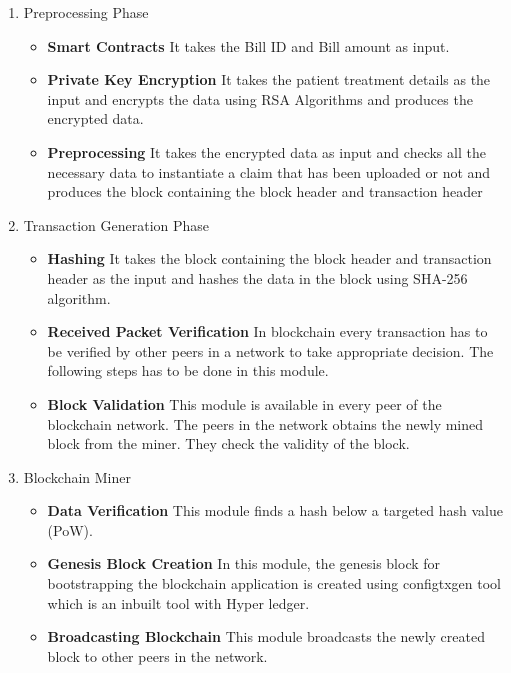 \begin{enumerate}
    \item Preprocessing Phase
    \begin{itemize}
        \item \textbf{Smart Contracts}
        It takes the Bill ID and Bill amount as input.
        
\item \textbf{Private Key Encryption}
It takes the patient treatment details as the input and encrypts the data using RSA Algorithms and produces the encrypted data.
\item \textbf{Preprocessing}
It takes the encrypted data as input and checks all the necessary data to instantiate a claim that has been uploaded or not and produces the block containing the block header and transaction header
    \end{itemize}
    \item Transaction Generation Phase
    \begin{itemize}
        \item \textbf{Hashing}
        It takes the block containing the block header and transaction header as the input and hashes the data in the block using SHA-256 algorithm.
        \item \textbf{Received Packet Verification}
        In blockchain every transaction has to be verified by other peers in a network to take appropriate decision. The following steps has to be done in this module.
        \item \textbf{Block Validation}
        This module is available in every peer of the blockchain network. The peers in the network obtains the newly mined block from the miner. They check the validity of the block.
    \end{itemize}
    \item Blockchain Miner
    \begin{itemize}
        \item \textbf{Data Verification}
        This module finds a hash below a targeted hash value (PoW).
        \item \textbf{Genesis Block Creation}
        In this module, the genesis block for bootstrapping the blockchain application is created using configtxgen tool which is an inbuilt tool with Hyper ledger.
        \item \textbf{Broadcasting Blockchain}
        This module broadcasts the newly created block to other peers in the network.
    \end{itemize}
    
\end{enumerate}

